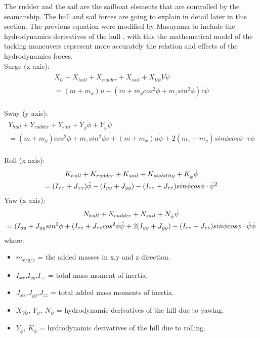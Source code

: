 The rudder and the sail are the sailboat elements that are controlled by the seamanship. The hull and sail forces are going to explain in detail later in this section. The previous equation were modified by Masuyama to include the hydrodynamics derivatives of the hull \cite{masuyama2011tacking}, with this \cite{de2004mathematical} the mathematical model of the tacking maneuvers represent more accurately the relation and effects of the hydrodynamics forces.\newline
\\
Surge  (x axis):
\begin{multline}\label{eq:force_xMasuyama}
    X_{U}+X_{hull}+X_{rudder}+X_{sail}+X_{V\Dot{\psi}}V\Dot{\psi}\\ =(m+m_{x})\Dot{u}-(m+m_{y}cos^2\phi+m_{z}sin^2\phi)v\Dot{\psi}
\end{multline}
\\
Sway  (y axis):
\begin{multline}
\label{eq:force_yMasuyama}
Y_{hull} + Y_{rudder} + Y_{sail} + Y_{\Dot{\phi}} \Dot{\phi} + Y_{\Dot{\psi}} \Dot{\psi} \\ 
=(m + m_{y})cos^2 \phi + m_{z} sin^2 \phi \Dot{v} + (m + m_{x})u \Dot{\psi} + 2(m_{z} - m_{y}) sin\phi cos\phi \cdot v \Dot{\phi}
\end{multline}
\\
Roll (x axis):
\begin{multline}
     K_{hull} + K_{rudder} + K_{sail} + K_{stability} +K_{\Dot{\phi}} \Dot{\phi} \\
 =(I_{xx} + J_{xx}) \Ddot{\phi} - {(I_{yy} + J_{yy})-(I_{zz} + J_{zz})} sin\phi cos\phi \cdot \Dot{\psi}^2
\end{multline}  \label{eq:m_xMasuyama}
\newline
Yaw (x axis):
\begin{multline}
   N_{hull}+N_{rudder}+N_{sail}+N_{\Dot{\psi}}\Dot{\psi}\\
 ={(I_{yy} + J_{yy}sin^2 \phi +(I_{zz} + J_{zz}cos^2 \phi}\Ddot{\psi} +2{(I_{yy} + J_{yy})-(I_{zz} + J_{zz})}sin\phi cos\phi \cdot \Dot{\psi} \Dot{\phi}  
\end{multline}\label{eq:m_yMasuyama}
\newline
where: 
\begin{itemize}  \label{symbols_motions2}
 \setlength \itemsep{0em}
\item $m_{x/y/z}$ = the added masses in x,y and z direction.
\item $I_{xx}$,$I_{yy}$,$I_{zz}$ = total mass moment of inertia.
\item $J_{xx}$,$J_{yy}$,$J_{zz}$ = total added mass moments of inertia.
\item $X_{V\Dot{\psi}}$, $Y_{\Dot{\psi}}$, $N_{\Dot{\psi}}$  = hydrodynamic derivatives of the hill due to yawing.
\item $Y_{\Dot{\phi}}$, $K_{\Dot{\phi}}$  = hydrodynamic derivatives of the hill due to rolling.
\end{itemize}
